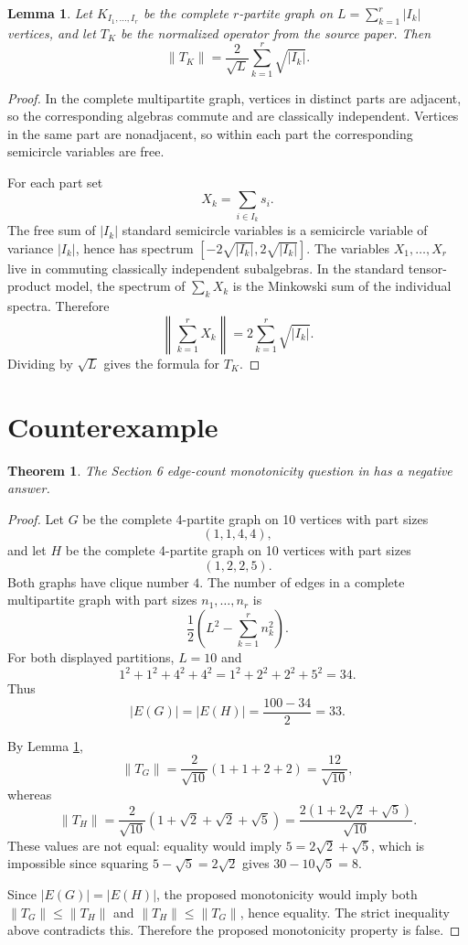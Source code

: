 \documentclass[11pt]{article}
\newtheorem{theorem}{Theorem}
\newtheorem{lemma}{Lemma}
\newcommand{\norm}[1]{\left\lVert #1\right\rVert}
\begin{document}
\begin{lemma}\label{lem:multipartite}
Let $K_{I_1,\ldots,I_r}$ be the complete $r$-partite graph on
$L=\sum_{k=1}^r |I_k|$ vertices, and let $T_K$ be the normalized operator from
the source paper.  Then
\[
   \norm{T_K}=\frac{2}{\sqrt L}\sum_{k=1}^r \sqrt{|I_k|}.
\]
\end{lemma}

\begin{proof}
In the complete multipartite graph, vertices in distinct parts are adjacent, so
the corresponding algebras commute and are classically independent.  Vertices in
the same part are nonadjacent, so within each part the corresponding semicircle
variables are free.

For each part set
\[
   X_k=\sum_{i\in I_k}s_i.
\]
The free sum of $|I_k|$ standard semicircle variables is a semicircle variable
of variance $|I_k|$, hence has spectrum
$[-2\sqrt{|I_k|},2\sqrt{|I_k|}]$.  The variables $X_1,\ldots,X_r$ live in
commuting classically independent subalgebras.  In the standard tensor-product
model, the spectrum of $\sum_k X_k$ is the Minkowski sum of the individual
spectra.  Therefore
\[
  \norm{\sum_{k=1}^r X_k}=2\sum_{k=1}^r\sqrt{|I_k|}.
\]
Dividing by $\sqrt L$ gives the formula for $T_K$.
\end{proof}

\section{Counterexample}

\begin{theorem}\label{thm:counterexample}
The Section 6 edge-count monotonicity question in \cite{STY} has a negative
answer.
\end{theorem}

\begin{proof}
Let $G$ be the complete 4-partite graph on 10 vertices with part sizes
\[
   (1,1,4,4),
\]
and let $H$ be the complete 4-partite graph on 10 vertices with part sizes
\[
   (1,2,2,5).
\]
Both graphs have clique number $4$.  The number of edges in a complete
multipartite graph with part sizes $n_1,\ldots,n_r$ is
\[
   \frac12\left(L^2-\sum_{k=1}^r n_k^2\right).
\]
For both displayed partitions, $L=10$ and
\[
   1^2+1^2+4^2+4^2=1^2+2^2+2^2+5^2=34.
\]
Thus
\[
   |E(G)|=|E(H)|=\frac{100-34}{2}=33.
\]

By Lemma \ref{lem:multipartite},
\[
   \norm{T_G}
   =\frac{2}{\sqrt{10}}(1+1+2+2)
   =\frac{12}{\sqrt{10}},
\]
whereas
\[
   \norm{T_H}
   =\frac{2}{\sqrt{10}}(1+\sqrt2+\sqrt2+\sqrt5)
   =\frac{2(1+2\sqrt2+\sqrt5)}{\sqrt{10}}.
\]
These values are not equal: equality would imply
$5=2\sqrt2+\sqrt5$, which is impossible since squaring
$5-\sqrt5=2\sqrt2$ gives $30-10\sqrt5=8$.

Since $|E(G)|=|E(H)|$, the proposed monotonicity would imply both
$\norm{T_G}\le\norm{T_H}$ and $\norm{T_H}\le\norm{T_G}$, hence equality.  The
strict inequality above contradicts this.  Therefore the proposed monotonicity
property is false.
\end{proof}
\end{document}
